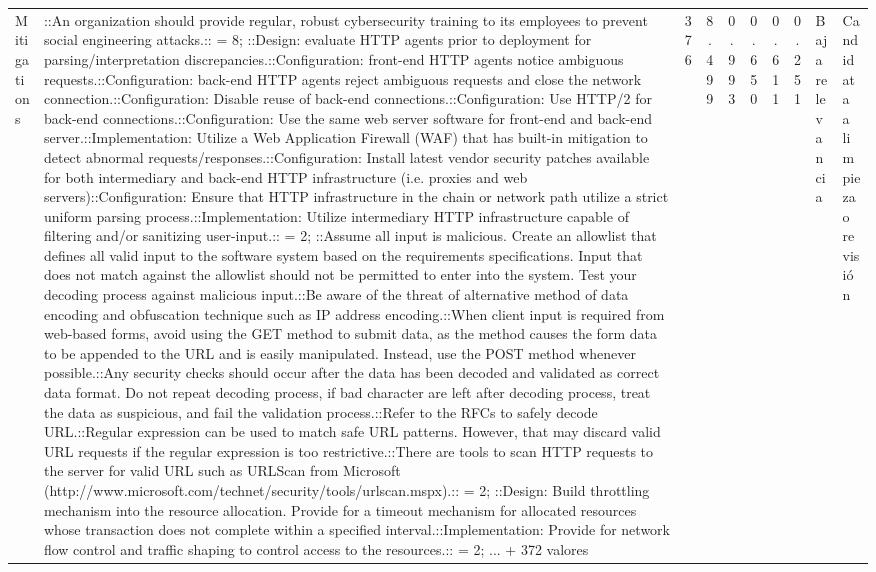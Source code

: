 \begin{table}[h]
\begin{tabular}{|p{2.1cm}|p{3.0cm}|c|c|c|c|c|c|p{2.5cm}|p{2.8cm}|}
Mitigations & ::An organization should provide regular, robust cybersecurity training to its employees to prevent social engineering attacks.:: = 8; ::Design: evaluate HTTP agents prior to deployment for parsing/interpretation discrepancies.::Configuration: front-end HTTP agents notice ambiguous requests.::Configuration: back-end HTTP agents reject ambiguous requests and close the network connection.::Configuration: Disable reuse of back-end connections.::Configuration: Use HTTP/2 for back-end connections.::Configuration: Use the same web server software for front-end and back-end server.::Implementation: Utilize a Web Application Firewall (WAF) that has built-in mitigation to detect abnormal requests/responses.::Configuration: Install latest vendor security patches available for both intermediary and back-end HTTP infrastructure (i.e. proxies and web servers)::Configuration: Ensure that HTTP infrastructure in the chain or network path utilize a strict uniform parsing process.::Implementation: Utilize intermediary HTTP infrastructure capable of filtering and/or sanitizing user-input.:: = 2; ::Assume all input is malicious. Create an allowlist that defines all valid input to the software system based on the requirements specifications. Input that does not match against the allowlist should not be permitted to enter into the system. Test your decoding process against malicious input.::Be aware of the threat of alternative method of data encoding and obfuscation technique such as IP address encoding.::When client input is required from web-based forms, avoid using the GET method to submit data, as the method causes the form data to be appended to the URL and is easily manipulated. Instead, use the POST method whenever possible.::Any security checks should occur after the data has been decoded and validated as correct data format. Do not repeat decoding process, if bad character are left after decoding process, treat the data as suspicious, and fail the validation process.::Refer to the RFCs to safely decode URL.::Regular expression can be used to match safe URL patterns. However, that may discard valid URL requests if the regular expression is too restrictive.::There are tools to scan HTTP requests to the server for valid URL such as URLScan from Microsoft (http://www.microsoft.com/technet/security/tools/urlscan.mspx).:: = 2; ::Design: Build throttling mechanism into the resource allocation. Provide for a timeout mechanism for allocated resources whose transaction does not complete within a specified interval.::Implementation: Provide for network flow control and traffic shaping to control access to the resources.:: = 2; ... + 372 valores & 376 & 8.499 & 0.993 & 0.650 & 0.611 & 0.251 & Baja relevancia & Candidata a limpieza o revisión \\

\end{tabular}
\end{table}

